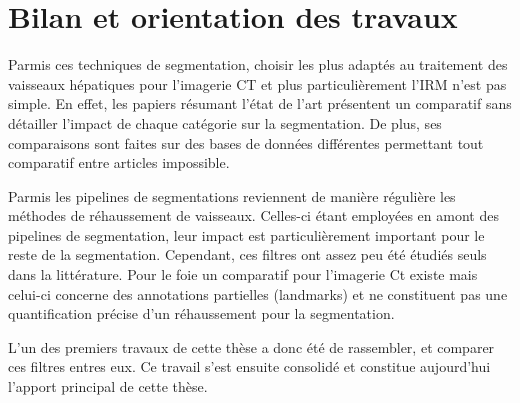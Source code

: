 \section{Bilan et orientation des travaux}
\label{sec:EA:bilan}

Parmis ces techniques de segmentation, choisir les plus adaptés au traitement des vaisseaux hépatiques pour l'imagerie CT et plus particulièrement l'IRM n'est pas simple. En effet, les papiers résumant l'état de l'art présentent un comparatif sans détailler l'impact de chaque catégorie sur la segmentation. De plus, ses comparaisons sont faites sur des bases de données différentes permettant tout comparatif entre articles impossible.

Parmis les pipelines de segmentations reviennent de manière régulière les méthodes de réhaussement de vaisseaux. Celles-ci étant employées en amont des pipelines de segmentation, leur impact est particulièrement important pour le reste de la segmentation. Cependant, ces filtres ont assez peu été étudiés seuls dans la littérature. Pour le foie un comparatif pour l'imagerie Ct existe mais celui-ci concerne des annotations partielles (landmarks) et ne constituent pas une quantification précise d'un réhaussement pour la segmentation.

L'un des premiers travaux de cette thèse a donc été de rassembler, et comparer ces filtres entres eux. Ce travail s'est ensuite consolidé et constitue aujourd'hui l'apport principal de cette thèse.